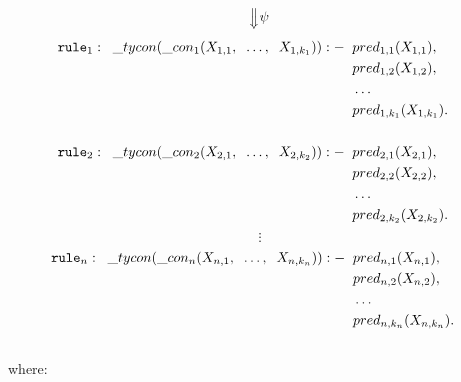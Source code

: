 $$\SLongdownarrow \psi$$
\begin{align*}
	\texttt{rule}_1: \;\; \_ tycon (\_ con_1(X_{1,1}, \;\; \ldots, \;\; X_{1,k_1})) :-&
	\;\; pred_{1, 1}(X_{1,1}), && \\
	  & \;\; pred_{1, 2}(X_{1,2}),     &   &   \\
	  & \;\; \ldots \;\;               &   &   \\
	  & \;\; pred_{1, k_1}(X_{1,k_1}). &   &   \\
	\\
	\texttt{rule}_2: \;\; \_ tycon (\_ con_2(X_{2,1}, \;\; \ldots, \;\; X_{2,k_2})) :-&
	\;\; pred_{2, 1}(X_{2,1}), && \\
	  & \;\; pred_{2, 2}(X_{2,2}),     &   &   \\
	  & \;\; \ldots \;\;               &   &   \\
	  & \;\; pred_{2, k_2}(X_{2,k_2}). &   &   
\end{align*}
$$\vdots$$
\begin{align*}
	\texttt{rule}_n: \;\; \_ tycon (\_ con_n(X_{n,1}, \;\; \ldots, \;\; X_{n,k_n})) :-&
	\;\; pred_{n, 1}(X_{n,1}), && \\
	  & \;\; pred_{n, 2}(X_{n,2}),     &   &   \\
	  & \;\; \ldots \;\;               &   &   \\
	  & \;\; pred_{n, k_n}(X_{n,k_n}). &   &   \\
\end{align*}\\
where:
